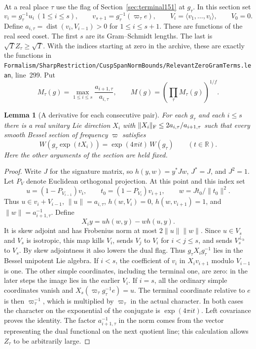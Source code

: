 \documentclass[a4paper,11pt]{article}
\newtheorem{lemma}[proposition]{Lemma}
\theoremstyle{definition}
\theoremstyle{remark}
\newcommand{\RR}{\mathbb R}\newcommand{\CC}{\mathbb C}\newcommand{\QQ}{\mathbb Q}
\newcommand{\srcloc}[2]{{\small\nolinkurl{#1.lean}}, line~#2}
\numberwithin{equation}{section}
\begin{document}
At a real place \(\tau\) use the flag of
Section~\ref{sec:terminal151} at \(g_\tau\). In this section set
\[
 v_i=g_\tau^{-1}u_i\ (1\le i\le s),\qquad
 v_{s+1}=g_\tau^{-1}(\varpi_\tau e),\qquad
 V_i=\langle v_1,\ldots,v_i\rangle,\qquad V_0=0 .
\]
Define \(a_{i,\tau}=\operatorname{dist}(v_i,V_{i-1})>0\)
for \(1\le i\le s+1\). These are functions of the real seed
coset. The first \(s\) are its Gram--Schmidt lengths. The last
is \(\sqrt T Z_\tau\ge\sqrt T\). With the indices starting at
zero in the archive, these are exactly the functions in
\srcloc{Formalism/SharpRestriction/CuspSpanNormBounds/RelevantZeroGramTerms}{299}.
Put
\[
 M_\tau(g)=\max_{1\le i\le s}\frac{a_{i+1,\tau}}{a_{i,\tau}},
       \qquad M(g)=\left(\prod_\tau M_\tau(g)\right)^{1/f}.
\]

\begin{lemma}[A derivative for each consecutive pair]
\label{lem:roots153}
For each \(g_\tau\) and each \(i\le s\) there is a real
unitary Lie direction \(X_i\) with
\(\|X_i\|_{\rm F}\le2a_{i,\tau}/a_{i+1,\tau}\) such that
every smooth Bessel section of frequency \(\varpi\) satisfies
\[
         W(g_\tau\exp(tX_i))=\exp(4\pi i t)\,W(g_\tau)
                 \qquad(t\in\RR).
\]
Here the other arguments of the section are held fixed.
\end{lemma}
\begin{proof}
Write \(J\) for the signature matrix, so \(h(y,w)=y^*Jw\),
\(J^*=J\), and \(J^2=1\). Let \(P_V\) denote Euclidean
orthogonal projection. At this point and this index set
\[
    u=(1-P_{V_{i-1}})v_i,\qquad
    t_0=(1-P_{V_i})v_{i+1},\qquad
    w=Jt_0/\|t_0\|^2 .
\]
Thus \(u\in v_i+V_{i-1}\), \(\|u\|=a_{i,\tau}\),
\(h(w,V_i)=0\), \(h(w,v_{i+1})=1\), and
\(\|w\|=a_{i+1,\tau}^{-1}\). Define
\[
                X_i y=u h(w,y)-w h(u,y).
\]
It is skew adjoint and has Frobenius norm at most
\(2\|u\|\|w\|\). Since \(u\in V_s\) and \(V_s\) is isotropic,
this map kills \(V_i\), sends \(V_j\) to \(V_i\) for
\(i<j\le s\), and sends \(V_s^{\perp_h}\) to \(V_s\).
By skew adjointness it also lowers the dual flag. Thus
\(g_\tau X_i g_\tau^{-1}\) lies in the Bessel unipotent
Lie algebra. If \(i<s\), the coefficient of \(v_i\) in
\(X_i v_{i+1}\) modulo \(V_{i-1}\) is one. The other simple
coordinates, including the terminal one, are zero: in the
later steps the image lies in the earlier \(V_i\).
If \(i=s\), all the ordinary simple coordinates vanish and
\(X_s(\varpi_\tau g_\tau^{-1}e)=u\). The terminal coordinate
relative to \(e\) is then \(\varpi_\tau^{-1}\), which is
multiplied by \(\varpi_\tau\) in the actual character.
In both cases the character on the exponential of the
conjugate is \(\exp(4\pi i t)\). Left covariance proves the
identity. The factor \(a_{i+1,\tau}^{-1}\) in the norm comes
from the vector representing the dual functional on the next
quotient line; this calculation allows \(Z_\tau\) to be
arbitrarily large.
\end{proof}
\end{document}
